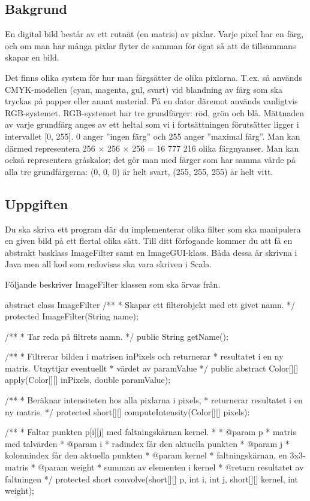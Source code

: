 

\subsection{Bakgrund}

En digital bild består av ett rutnät (en matris) av pixlar. Varje pixel har en färg, och om man har många pixlar flyter de samman för ögat så att de tillsammans skapar en bild.

Det finns olika system för hur man färgsätter de olika pixlarna. T.ex. så används CMYK-modellen (cyan, magenta, gul, svart) vid blandning av färg som ska tryckas på papper eller annat material. På en dator däremot används vanligtvis RGB-systemet. RGB-systemet har tre grundfärger: röd, grön och blå. Mättnaden av varje grundfärg anges av ett heltal som vi i fortsättningen förutsätter ligger i intervallet [0, 255]. 0 anger ”ingen färg” och 255 anger ”maximal färg”. Man kan därmed representera 256 × 256 × 256 = 16 777 216 olika färgnyanser. Man kan också representera gråskalor; det gör man med färger som har samma värde på alla tre grundfärgerna: (0, 0, 0) är helt svart, (255, 255, 255) är helt vitt.


\subsection{Uppgiften}
Du ska skriva ett program där du implementerar olika filter som ska manipulera en given bild på ett flertal olika sätt. Till ditt förfogande kommer du att få en abstrakt basklass ImageFilter samt en ImageGUI-klass. Båda dessa är skrivna i Java men all kod som redovisas ska vara skriven i Scala.

Följande beskriver ImageFilter klassen som ska ärvas från.

\begin{JavaSpec}{abstract class ImageFilter}
/**
 * Skapar ett filterobjekt med ett givet namn.
 */
protected ImageFilter(String name);

/**
 * Tar reda på filtrets namn.
 */
public String getName();

/**
 * Filtrerar bilden i matrisen inPixels och returnerar
 * resultatet i en ny matris. Utnyttjar eventuellt 
 * värdet av paramValue
 */
public abstract Color[][] apply(Color[][] inPixels,
				 double paramValue);

/**
 * Beräknar intensiteten hos alla pixlarna i pixels,
 * returnerar resultatet i en ny matris.
 */
protected short[][] computeIntensity(Color[][] pixels):

/**
 * Faltar punkten p[i][j] med faltningskärnan kernel.
 * 
 * @param p
 *            matris med talvärden
 * @param i
 *            radindex får den aktuella punkten
 * @param j
 *            kolonnindex får den aktuella punkten
 * @param kernel
 *            faltningskärnan, en 3x3-matris
 * @param weight
 *            summan av elementen i kernel
 * @return resultatet av faltningen
 */
protected short convolve(short[][] p, int i, int j, 
			short[][] kernel, int weight);
\end{JavaSpec}


